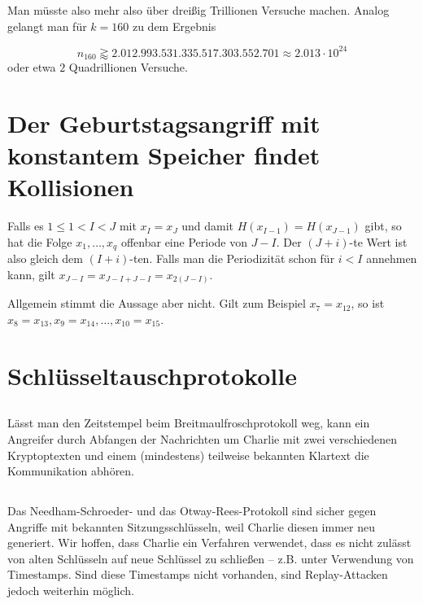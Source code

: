 \documentclass{../crypto}
\begin{document}
Man müsste also mehr also über dreißig Trillionen
Versuche machen. Analog gelangt man für $k=160$ zu dem Ergebnis 

\begin{equation*}
   n_{160} \gtrapprox 2.012.993.531.335.517.303.552.701 \approx 2.013 \cdot 10^{24}
\end{equation*}
oder etwa $2$ Quadrillionen Versuche.

\section{Der Geburtstagsangriff mit konstantem Speicher findet Kollisionen}

Falls es $1 \le 1 < I < J$ mit $x_I = x_J$ und damit $H(x_{I-1}) = H(x_{J-1})$
gibt, so hat die Folge $x_1,\ldots,x_q$ offenbar eine Periode von $J - I$. Der
$(J+i)$-te Wert ist also gleich dem $(I+i)$-ten. Falls man die Periodizität schon für $i
< I$ annehmen kann, gilt $x_{J-I} = x_{J-I + J-I} = x_{2(J-I)}$.

Allgemein stimmt die Aussage aber nicht. Gilt zum Beispiel $x_7 = x_{12}$, so
ist $x_8 = x_{13}, x_9 = x_{14},\ldots,x_{10} = x_{15}$.

\section{Schlüsseltauschprotokolle}

\subsection{}

Lässt man den Zeitstempel beim Breitmaulfroschprotokoll weg, kann ein Angreifer
durch Abfangen der Nachrichten um Charlie mit zwei verschiedenen Kryptoptexten
und einem (mindestens) teilweise bekannten Klartext die Kommunikation abhören.

\subsection{}

Das Needham-Schroeder- und das Otway-Rees-Protokoll sind sicher gegen Angriffe
mit bekannten Sitzungsschlüsseln, weil Charlie diesen immer neu generiert. Wir
hoffen, dass Charlie ein Verfahren verwendet, dass es nicht zulässt von alten
Schlüsseln auf neue Schlüssel zu schließen -- z.B.  unter Verwendung von
Timestamps. Sind diese Timestamps nicht vorhanden, sind Replay-Attacken jedoch
weiterhin möglich.
\end{document}

